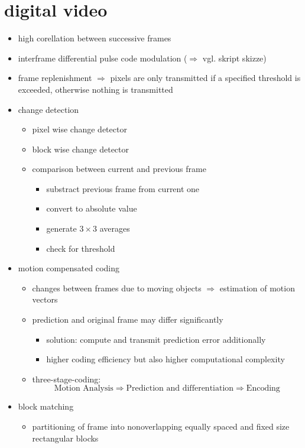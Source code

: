 \documentclass[a4paper,10pt]{scrreprt}
\begin{document}
\section{digital video}
\begin{itemize}
 \item high corellation between successive frames
 \item interframe differential pulse code modulation ($\Rightarrow$ vgl. skript skizze)
 \item frame replenishment $\Rightarrow$ pixels are only transmitted if a specified threshold is exceeded, otherwise nothing is transmitted
 \item change detection
 \begin{itemize}
  \item pixel wise change detector
  \item block wise change detector
  \item comparison between current and previous frame
  \begin{itemize}
   \item substract previous frame from current one
   \item convert to absolute value
   \item generate $3\times 3$ averages
   \item check for threshold
  \end{itemize}
 \end{itemize}
 \item motion compensated coding 
 \begin{itemize}
  \item changes between frames due to moving objects $\Rightarrow$ estimation of motion vectors
  \item prediction and original frame may differ significantly
  \begin{itemize}
   \item solution: compute and transmit prediction error additionally
   \item higher coding efficiency but also higher computational complexity
  \end{itemize}
  \item three-stage-coding:
  \[ \text{Motion Analysis} \Rightarrow \text{Prediction and differentiation} \Rightarrow \text{Encoding} \]
 \end{itemize}
 \item block matching
 \begin{itemize}
  \item partitioning of frame into nonoverlapping equally spaced and fixed size rectangular blocks

\end{itemize}
\end{itemize}
\end{document}
